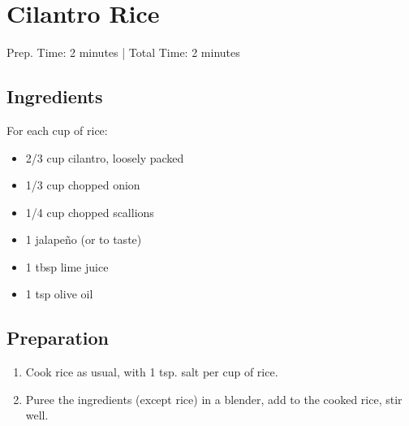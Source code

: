 \section{Cilantro Rice}

\begin{center}
Prep. Time: 2 minutes |
Total Time: 2 minutes
\end{center}

\subsection{Ingredients}
For each cup of rice:
\begin{multicols}{2}
\begin{itemize}
    \item 2/3 cup cilantro, loosely packed
    \item 1/3 cup chopped onion
    \item 1/4 cup chopped scallions
    \item 1 jalape\~{n}o (or to taste)
    \item 1 tbsp lime juice
    \item 1 tsp olive oil
\end{itemize}
\end{multicols}

\subsection{Preparation}
\begin{enumerate}
    \item Cook rice as usual, with 1 tsp. salt per cup of rice.
    \item Puree the ingredients (except rice) in a blender, add to the cooked rice, stir well.
\end{enumerate}
